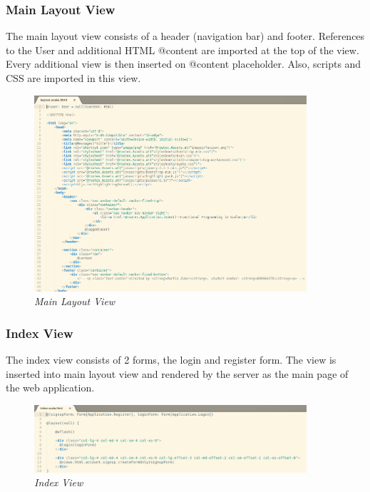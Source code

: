 \documentclass[12pt,twoside,a4paper]{report}
\begin{document}
\subsubsection{Main Layout View}\label{4.3.1.1}
The main layout view consists of a header (navigation bar) and footer. References to the User and additional HTML @content are imported at the top of the view. Every additional view is then inserted on @content placeholder. Also, scripts and CSS are imported in this view.

\begin{figure}[!ht]
	\centering
		\includegraphics[width=0.9\textwidth, totalheight=8cm]
		{main_layout_view}
	\caption{\textit{Main Layout View}}
	\label{f4.3.1.1}
\end{figure}

\subsubsection{Index View}\label{4.3.1.2}
The index view consists of 2 forms, the login and register form. The view is inserted into main layout view and rendered by the server as the main page of the web application.

\begin{figure}[!ht]
	\centering
		\includegraphics[width=0.9\textwidth, totalheight=4cm]
		{index_view}
	\caption{\textit{Index View}}
	\label{f4.3.1.2}
\end{figure}
\end{document}
